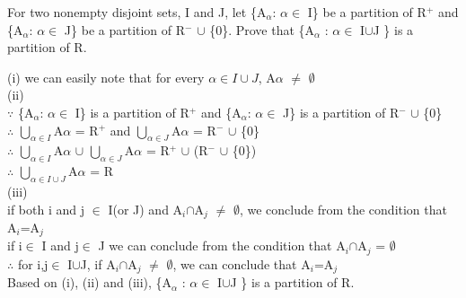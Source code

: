 \documentclass[11pt, a4paper, UTF8]{ctexart}
\begin{document}
\begin{problem}[UD:11.8]
For two nonempty disjoint sets, I and J, let \{A$_\alpha$: $\alpha \in$ I\} be a partition of R$^+$ and \{A$_\alpha$: $\alpha \in$ J\} be a partition of R$^-$ $\cup$ \{0\}. Prove that \{A$_\alpha$ : $\alpha \in$ I$\cup$J \} is a partition of R.
\end{problem}
\begin{solution}
(i) we can easily note that for every $\alpha \in I \cup J$, A$\alpha$ $\not=$ $\emptyset$\\
(ii) \\
$\because$ \{A$_\alpha$: $\alpha \in$ I\} is a partition of R$^+$ and \{A$_\alpha$: $\alpha \in$ J\} is a partition of R$^-$ $\cup$ \{0\}\\
$\therefore$ $\bigcup_{\alpha \in I}$A$\alpha$ = R$^+$ and $\bigcup_{\alpha \in J}$A$\alpha$ = R$^-$ $\cup$ \{0\}\\
$\therefore$ $\bigcup_{\alpha \in I}$A$\alpha$ $\cup$ $\bigcup_{\alpha \in J}$A$\alpha$ = R$^+$ $\cup$ (R$^-$ $\cup$ \{0\})\\
$\therefore$ $\bigcup_{\alpha \in I\cup J}$A$\alpha$ = R\\
(iii)\\
if  both i and j $\in$ I(or J)  and A$_i$$\cap$A$_j$ $\not=$ $\emptyset$, we conclude from the condition that A$_i$=A$_j$\\
if i$\in$ I and j$\in$ J we can conclude from the condition that A$_i$$\cap$A$_j$ = $\emptyset$\\
$\therefore$ for i,j$\in$ I$\cup$J, if A$_i$$\cap$A$_j$ $\not=$ $\emptyset$, we can conclude that A$_i$=A$_j$\\
Based on (i), (ii) and (iii), \{A$_\alpha$ : $\alpha \in$ I$\cup$J \} is a partition of R.
\end{solution}
\end{document}

